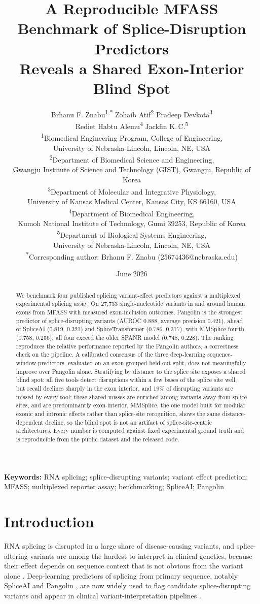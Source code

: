 \documentclass[11pt]{article}
\title{\textbf{A Reproducible MFASS Benchmark of Splice-Disruption Predictors\\ Reveals a Shared Exon-Interior Blind Spot}}
\author{Brhanu F. Znabu\textsuperscript{1,*} \quad Zohaib Atif\textsuperscript{2} \quad Pradeep Devkota\textsuperscript{3}\\[2pt]
Rediet Habtu Alemu\textsuperscript{4} \quad Jackfin K.\,C.\textsuperscript{5} \\[3pt]
\small \textsuperscript{1}Biomedical Engineering Program, College of Engineering,\\
\small University of Nebraska-Lincoln, Lincoln, NE, USA \\
\small \textsuperscript{2}Department of Biomedical Science and Engineering,\\
\small Gwangju Institute of Science and Technology (GIST), Gwangju, Republic of Korea \\
\small \textsuperscript{3}Department of Molecular and Integrative Physiology,\\
\small University of Kansas Medical Center, Kansas City, KS 66160, USA \\
\small \textsuperscript{4}Department of Biomedical Engineering,\\
\small Kumoh National Institute of Technology, Gumi 39253, Republic of Korea \\
\small \textsuperscript{5}Department of Biological Systems Engineering,\\
\small University of Nebraska-Lincoln, Lincoln, NE, USA \\[3pt]
\small \textsuperscript{*}Corresponding author: Brhanu F. Znabu (25674436@nebraska.edu)}
\date{June 2026}
\let\oldsection\section
\renewcommand{\section}{\Needspace*{7\baselineskip}\oldsection}
\begin{document}
\maketitle

\begin{abstract}
\noindent
We benchmark four published splicing variant-effect predictors against a
multiplexed experimental splicing assay. On 27{,}733
single-nucleotide variants in and around human exons from MFASS with measured exon-inclusion outcomes,
Pangolin is the strongest predictor of splice-disrupting variants (AUROC 0.888,
average precision 0.421), ahead of SpliceAI (0.819, 0.321) and SpliceTransformer
(0.786, 0.317), with MMSplice fourth (0.758, 0.256); all four exceed the older SPANR model (0.748, 0.228).
The ranking reproduces the relative performance reported by the Pangolin authors,
a correctness check on the pipeline. A calibrated consensus of the three deep-learning
sequence-window predictors, evaluated on an exon-grouped held-out split, does not meaningfully
improve over Pangolin alone. Stratifying by distance to the splice site exposes a
shared blind spot: all five tools detect disruptions within a few bases of the
splice site well, but recall declines sharply in the exon interior, and 19\% of
disrupting variants are missed by every tool; these shared misses are enriched among
variants away from splice sites, and are predominantly exon-interior. MMSplice, the one
model built for modular exonic and intronic effects rather than splice-site
recognition, shows the same distance-dependent decline, so the blind spot is not an
artifact of splice-site-centric architectures. Every
number is computed against fixed experimental ground truth and is reproducible
from the public dataset and the released code.
\end{abstract}

\vspace{4pt}
\noindent\textbf{Keywords:} RNA splicing; splice-disrupting variants; variant effect prediction; MFASS; multiplexed reporter assay; benchmarking; SpliceAI; Pangolin

\section{Introduction}
RNA splicing is disrupted in a large share of disease-causing variants, and
splice-altering variants are among the hardest to interpret in clinical genetics,
because their effect depends on sequence context that is not obvious from the
variant alone \cite{splicingdisease,wangcooper,cartegni}. Deep-learning predictors of splicing from
primary sequence, notably SpliceAI \cite{spliceai} and Pangolin \cite{pangolin},
are now widely used to flag candidate splice-disrupting variants and appear in
clinical variant-interpretation pipelines \cite{acmg,acmgsplice}.
\end{document}
